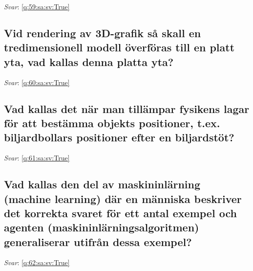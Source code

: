 \documentclass[a4paper,11pt,oneside]{article}
\begin{document}
\begin{sloppypar}
\textit{Svar}: \autoref{q:59:sa:sv:True}



\subsection{Vid rendering av 3D-grafik s\r{a} skall en tredimensionell modell \"overf\"oras till en platt yta, vad kallas denna platta yta?}

\label{q:60:sa:sv:False}

\vspace{2cm}

\noindent\makebox[\textwidth]{\hrulefill}

\vspace{1cm}

\textit{Svar}: \autoref{q:60:sa:sv:True}



\subsection{Vad kallas det n\"ar man till\"ampar fysikens lagar f\"or att best\"amma objekts positioner, t.ex. biljardbollars positioner efter en biljardst\"ot?}

\label{q:61:sa:sv:False}

\vspace{2cm}

\noindent\makebox[\textwidth]{\hrulefill}

\vspace{1cm}

\textit{Svar}: \autoref{q:61:sa:sv:True}



\subsection{Vad kallas den del av maskininl\"arning (machine learning) d\"ar en m\"anniska beskriver det korrekta svaret f\"or ett antal exempel och agenten (maskininl\"arningsalgoritmen) generaliserar utifr\r{a}n dessa exempel?}

\label{q:62:sa:sv:False}

\vspace{2cm}

\noindent\makebox[\textwidth]{\hrulefill}

\vspace{1cm}

\textit{Svar}: \autoref{q:62:sa:sv:True}




\end{sloppypar}
\end{document}
